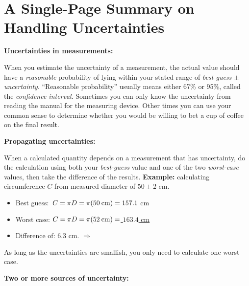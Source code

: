 \section{A Single-Page Summary on Handling Uncertainties}
\label{uncertainty}

\textbf{Uncertainties in measurements:}
\vspace{-0.15cm}

When you estimate the uncertainty of a measurement, the actual value should have a \textit{reasonable} probability of lying within your stated range of \textit{best guess $\pm$ uncertainty}.  ``Reasonable probability'' usually means either 67\% or 95\%, called the \textit{confidence interval}.  Sometimes you can only know the uncertainty from reading the manual for the measuring device.  Other times you can use your common sense to determine whether you would be willing to bet a cup of coffee on the final result.
\vspace{+0.15cm}

\textbf{Propagating uncertainties:}
\vspace{-0.15cm}

When a calculated quantity depends on a measurement that has uncertainty, do the calculation using both your \textit{best-guess} value and one of the two \textit{worst-case} values, then take the difference of the results.  \textbf{Example:} calculating circumference $C$ from measured diameter of $50\pm2$ cm.
\begin{itemize} \itemsep1pt
\vspace{-0.35cm}
	\item Best guess: $\,C=\pi D =\pi(50 \:\rm{cm}) = 157.1$ cm
	\item Worst case: $C=\pi D =\pi(52 \:\rm{cm}) =$\underline{ $163.4$  cm}
\vspace{-0.10cm}
	\item Difference of:        \hspace{100pt}                   6.3 cm. $\Longrightarrow$ 
\end{itemize}
\vspace{-0.35cm}
As long as the uncertainties are smallish, you only need to calculate one worst case.
\vspace{+0.15cm}

\textbf{Two or more sources of uncertainty:}
\vspace{-0.15cm}

